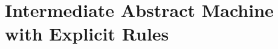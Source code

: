 \documentclass{article}
\begin{document}
\ottdefnsAbstractHighLevelSmallStep


\newpage
\section*{Intermediate Abstract Machine
  with Explicit Rules}

\ottdefnsAbstractExplicitSmallStep
\end{document}
